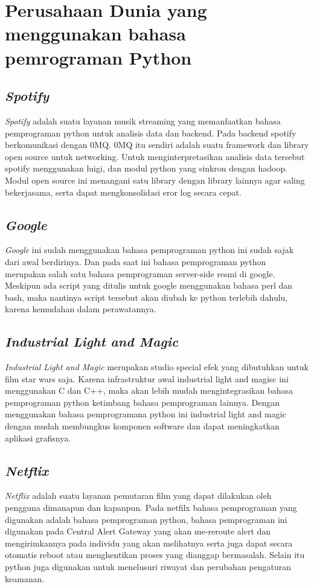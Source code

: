 \chapter*{Perusahaan Dunia yang menggunakan bahasa pemrograman Python}

\section*{\textit{Spotify}}
\par
\textit{Spotify} adalah suatu layanan musik streaming yang memanfaatkan bahasa pemprograman python untuk analisis data dan backend. Pada backend spotify berkomunikasi dengan 0MQ. 0MQ itu sendiri adalah suatu framework dan library open source untuk networking. Untuk menginterpretasikan analisis data tersebut spotify menggunakan luigi, dan modul python yang sinkron dengan hadoop. Modul open source ini menangani satu library dengan library lainnya agar saling bekerjasama, serta dapat mengkonsolidasi eror log secara cepat.
\section*{\textit{Google}}
\par
\textit{Google} ini sudah menggunakan bahasa pemprograman python ini sudah sajak dari awal berdirinya. Dan pada saat ini bahasa pemprograman python merupakan salah satu bahasa pemprograman server-side resmi di google. Meskipun ada script yang ditulis untuk google menggunakan bahasa perl dan bash, maka nantinya script tersebut akan diubah ke python terlebih dahulu, karena kemudahan dalam perawatannya.

\section*{\textit{Industrial Light and Magic}}
\par
\textit{Industrial Light and Magic} merupakan studio special efek yang dibutuhkan untuk film star wars saja. Karena infrastruktur awal industrial light and magisc ini menggunakan C dan C++, maka akan lebih mudah mengintegrasikan bahasa pemprograman python ketimbang bahasa pemprograman lainnya. Dengan menggunakan bahasa pemprogramana python ini industrial light and magic dengan mudah membungkus komponen software dan dapat meningkatkan aplikasi grafisnya.

\section*{\textit{Netflix}}
\par
\textit{Netflix} adalah suatu layanan pemutaran film yang dapat dilakukan oleh pengguna dimanapun dan kapanpun. Pada netfilx bahasa pemprograman yang digunakan adalah bahasa pemprograman python, bahasa pemprograman ini digunakan pada Central Alert Gateway yang akan me-reroute alert dan mengirimkannya pada individu yang akan melihatnya serta juga  dapat secara otomatis reboot atau menghentikan proses yang dianggap bermasalah. Selain itu python juga digunakan untuk menelusuri riwayat dan perubahan pengaturan keamanan.

